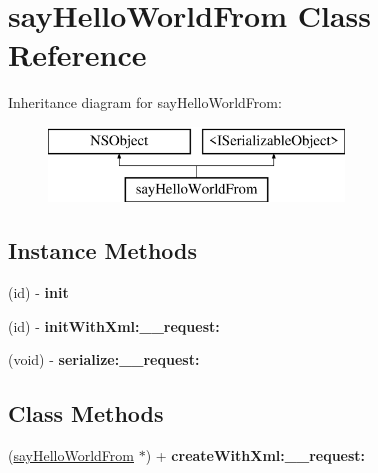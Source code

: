 \hypertarget{interfacesay_hello_world_from}{}\section{say\+Hello\+World\+From Class Reference}
\label{interfacesay_hello_world_from}
Inheritance diagram for say\+Hello\+World\+From\+:\begin{figure}[H]
\begin{center}
\leavevmode
\includegraphics[height=2.000000cm]{interfacesay_hello_world_from}
\end{center}
\end{figure}
\subsection*{Instance Methods}
\begin{DoxyCompactItemize}
\item 
\hypertarget{interfacesay_hello_world_from_ab701b4545a4d0d161fe2019ab9a197d5}{}(id) -\/ {\bfseries init}\label{interfacesay_hello_world_from_ab701b4545a4d0d161fe2019ab9a197d5}

\item 
\hypertarget{interfacesay_hello_world_from_ac604a752f7a11bfec3eb0c1bb3fa2422}{}(id) -\/ {\bfseries init\+With\+Xml\+:\+\_\+\+\_\+request\+:}\label{interfacesay_hello_world_from_ac604a752f7a11bfec3eb0c1bb3fa2422}

\item 
\hypertarget{interfacesay_hello_world_from_af455f7453aef6bb37ff694d1d750baa0}{}(void) -\/ {\bfseries serialize\+:\+\_\+\+\_\+request\+:}\label{interfacesay_hello_world_from_af455f7453aef6bb37ff694d1d750baa0}

\end{DoxyCompactItemize}
\subsection*{Class Methods}
\begin{DoxyCompactItemize}
\item 
\hypertarget{interfacesay_hello_world_from_ace27434dff24297cba32cffe05285c1f}{}(\hyperlink{interfacesay_hello_world_from}{say\+Hello\+World\+From} $\ast$) + {\bfseries create\+With\+Xml\+:\+\_\+\+\_\+request\+:}\label{interfacesay_hello_world_from_ace27434dff24297cba32cffe05285c1f}

\end{DoxyCompactItemize}
